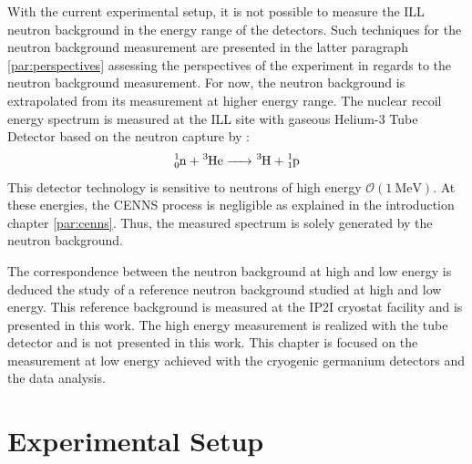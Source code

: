 With the current experimental setup, it is not possible to measure the ILL neutron background in the energy range of the detectors. Such techniques for the neutron background measurement are presented in the latter paragraph \ref{par:perspectives} assessing the perspectives of the \Ricochet{} experiment in regards to the neutron background measurement.
For now, the neutron background is extrapolated from its measurement at higher energy range.
The nuclear recoil energy spectrum is measured at the ILL site with gaseous Helium-3 Tube Detector based on the neutron capture by :
\begin{equation}
	\ce{^1_0n + ^3He -> ^3H + ^1_1p}
\end{equation}
This detector technology is sensitive to neutrons of high energy $\mathcal{O}(\SI{1}{\mega\eV})$. At these energies, the CENNS process is negligible as explained in the introduction chapter \ref{par:cenns}. Thus, the measured spectrum is solely generated by the neutron background.

The correspondence between the neutron background at high and low energy is deduced the study of a reference neutron background studied at high and low energy. This reference background is measured at the IP2I cryostat facility and is presented in this work. The high energy measurement is realized with the  tube detector and is not presented in this work. This chapter is focused on the measurement at low energy achieved with the cryogenic germanium detectors and the data analysis.
%

\section{Experimental Setup}

